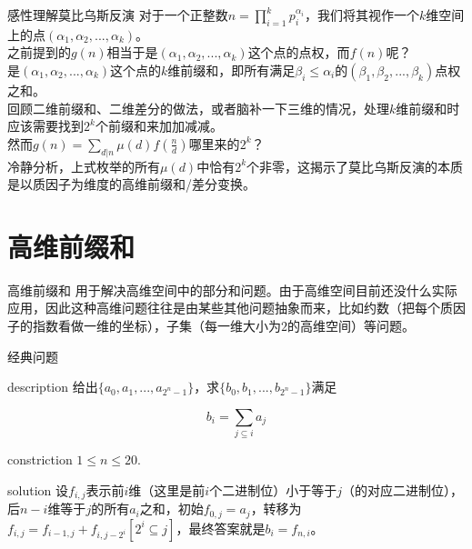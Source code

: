 \documentclass{beamer}
\begin{document}
	\begin{frame}{感性理解莫比乌斯反演}
		对于一个正整数$n=\prod_{i=1}^kp_i^{\alpha_i}$，我们将其视作一个$k$维空间上的点$(\alpha_1,\alpha_2,...,\alpha_k)$。\pause\\
		
		之前提到的$g(n)$相当于是$(\alpha_1,\alpha_2,...,\alpha_k)$这个点的点权，而$f(n)$呢？\pause\\
		
		是$(\alpha_1,\alpha_2,...,\alpha_k)$这个点的$k$维前缀和，即所有满足$\beta_i \le \alpha_i$的$(\beta_1,\beta_2,...,\beta_k)$点权之和。\pause\\
		
		回顾二维前缀和、二维差分的做法，或者脑补一下三维的情况，处理$k$维前缀和时应该需要找到$2^k$个前缀和来加加减减。\pause\\
		
		然而$g(n)=\sum_{d|n}\mu(d)f(\frac nd)$哪里来的$2^k$？\pause\\
		
		冷静分析，上式枚举的所有$\mu(d)$中恰有$2^k$个非零，这揭示了莫比乌斯反演的本质是以质因子为维度的高维前缀和/差分变换。
	\end{frame}
	\section{高维前缀和}
	\begin{frame}{高维前缀和}
		用于解决高维空间中的部分和问题。由于高维空间目前还没什么实际应用，因此这种高维问题往往是由某些其他问题抽象而来，比如约数（把每个质因子的指数看做一维的坐标），子集（每一维大小为$2$的高维空间）等问题。
		
	\end{frame}
	\begin{frame}{经典问题}
		\begin{block}{description}
			给出$\{a_0,a_1,...,a_{2^n-1}\}$，求$\{b_0,b_1,...,b_{2^n-1}\}$满足
			
			$$b_i=\sum_{j \subseteq i} a_j$$
			
		\end{block}
		\begin{block}{constriction}
			$1 \le n \le 20.$
		\end{block}
		\pause
		\begin{block}{solution}
			设$f_{i,j}$表示前$i$维（这里是前$i$个二进制位）小于等于$j$（的对应二进制位），后$n-i$维等于$j$的所有$a_i$之和，初始$f_{0,j}=a_j$，转移为$f_{i,j}=f_{i-1,j}+f_{i,j-2^i}[2^i \subseteq j]$，最终答案就是$b_i=f_{n,i}$。
		\end{block}
	\end{frame}
\end{document}
